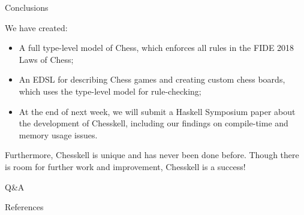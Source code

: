 \documentclass{beamer}
\begin{document}
\begin{frame}{Conclusions}

We have created:

\pause

\begin{itemize}
    \item<2-> A full type-level model of Chess, which enforces all rules in the FIDE 2018 Laws of Chess;
    \item<3-> An EDSL for describing Chess games and creating custom chess boards, which uses the type-level model for rule-checking;
    \item<4-> At the end of next week, we will submit a Haskell Symposium paper about the development of Chesskell, including our findings on compile-time and memory usage issues.
\end{itemize}

\begin{overprint}
Furthermore, Chesskell is unique and has never been done before. Though there is room for further work and improvement, Chesskell is a success!
\end{overprint}

    
\end{frame}

\begin{frame}[standout]

Q\&A
    
\end{frame}

\begin{frame}[allowframebreaks]{References}

\printbibliography
    
\end{frame}
\end{document}
